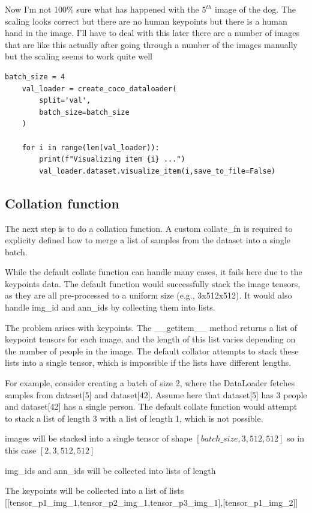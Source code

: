 Now I'm not 100\% sure what has happened with the $5^{th}$ image of the dog. The scaling looks correct but there are no human keypoints
but there is a human hand in the image. I'll have to deal with this later there are a number of images that are like this actually
after going through a number of the images manually but the scaling seems to work quite well


\begin{lstlisting}[style=pythonstyle,title={How to visualize},label={code:dataloader_visualize}]
    batch_size = 4
    val_loader = create_coco_dataloader(
        split='val',
        batch_size=batch_size
    )

    for i in range(len(val_loader)):
        print(f"Visualizing item {i} ...")
        val_loader.dataset.visualize_item(i,save_to_file=False)
\end{lstlisting}

\subsection{Collation function}

The next step is to do a collation function. A custom collate\_fn is required
to explicity defined how to merge a list of samples from the dataset into a
single batch.

While the default collate function can handle many cases, it fails here due to
the keypoints data. The default function would successfully stack the image
tensors, as they are all pre-processed to a uniform size (e.g., 3x512x512). It
would also handle img\_id and ann\_ids by collecting them into lists.

The problem arises with keypoints. The \_\_getitem\_\_ method returns a list of
keypoint tensors for each image, and the length of this list varies depending
on the number of people in the image. The default collator attempts to stack
these lists into a single tensor, which is impossible if the lists have
different lengths.

For example, consider creating a batch of size 2, where the DataLoader fetches
samples from dataset[5] and dataset[42]. Assume here that dataset[5] has 3
people and dataset[42] has a single person. The default collate function would
attempt to stack a list of length 3 with a list of length 1, which is not
possible.

\begin{compactitem}
	\item images will be stacked into a single tensor of shape $[batch\_size, 3, 512, 512]$ so in this case $[2, 3, 512, 512]$
	\item img\_ids and ann\_ids will be collected into lists of length
	\item The keypoints will be collected into a list of lists [[tensor\_p1\_img\_1,tensor\_p2\_img\_1,tensor\_p3\_img\_1],[tensor\_p1\_img\_2]]
\end{compactitem}

